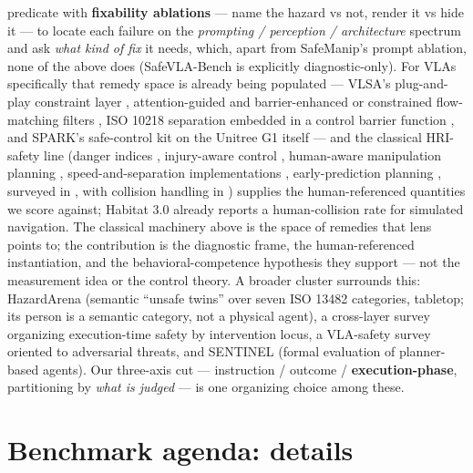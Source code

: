 \documentclass{article}
\begin{document}
predicate with \textbf{fixability ablations} --- name the hazard vs not, render it vs hide it --- to locate each failure on the \emph{prompting / perception / architecture} spectrum and ask \emph{what kind of fix} it needs, which, apart from SafeManip's prompt ablation, none of the above does (SafeVLA-Bench is explicitly diagnostic-only). For VLAs specifically that remedy space is already being populated --- VLSA's plug-and-play constraint layer \citep{ref22}, attention-guided \citep{ref41} and barrier-enhanced or constrained flow-matching filters \citep{ref42,ref43}, ISO 10218 separation embedded in a control barrier function \citep{ref44}, and SPARK's safe-control kit on the Unitree G1 itself \citep{ref40} --- and the classical HRI-safety line (danger indices \citep{ref46}, injury-aware control \citep{ref48}, human-aware manipulation planning \citep{ref49}, speed-and-separation implementations \citep{ref50}, early-prediction planning \citep{ref51}, surveyed in \citep{ref52}, with collision handling in \citep{ref47}) supplies the human-referenced quantities we score against; Habitat 3.0 \citep{ref45} already reports a human-collision rate for simulated navigation. The classical machinery above is the space of remedies that lens points to; the contribution is the diagnostic frame, the human-referenced instantiation, and the behavioral-competence hypothesis they support --- not the measurement idea or the control theory. A broader cluster surrounds this: HazardArena \citep{ref19} (semantic ``unsafe twins'' over seven ISO 13482 categories, tabletop; its person is a semantic category, not a physical agent), a cross-layer survey \citep{ref28} organizing execution-time safety by intervention locus, a VLA-safety survey \citep{ref29} oriented to adversarial threats, and SENTINEL \citep{ref31} (formal evaluation of planner-based agents). Our three-axis cut --- instruction / outcome / \textbf{execution-phase}, partitioning by \emph{what is judged} --- is one organizing choice among these.
\FloatBarrier%
\section{Benchmark agenda: details}
\end{document}
